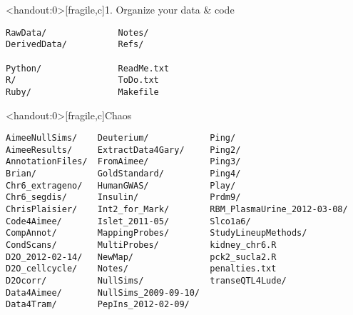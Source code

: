 \documentclass[12pt,t]{beamer}
\begin{document}
\begin{frame}<handout:0>[fragile,c]{1. Organize your data \& code}


\begin{center}
\begin{minipage}[c]{10.3cm}
\begin{semiverbatim}
\lstset{basicstyle=\normalsize}
\begin{lstlisting}[linewidth=10.3cm]
RawData/              Notes/
DerivedData/          Refs/

Python/               ReadMe.txt
R/                    ToDo.txt
Ruby/                 Makefile
\end{lstlisting}
\end{semiverbatim}
\end{minipage}
\end{center}

\end{frame}


\begin{frame}<handout:0>[fragile,c]{Chaos}

\addtocounter{framenumber}{-1}

\begin{center}
\begin{minipage}[c]{11.33cm}
\begin{semiverbatim}
\lstset{basicstyle=\scriptsize}
\begin{lstlisting}[linewidth=11.33cm]
AimeeNullSims/    Deuterium/            Ping/
AimeeResults/     ExtractData4Gary/     Ping2/
AnnotationFiles/  FromAimee/            Ping3/
Brian/            GoldStandard/         Ping4/
Chr6_extrageno/   HumanGWAS/            Play/
Chr6_segdis/      Insulin/              Prdm9/
ChrisPlaisier/    Int2_for_Mark/        RBM_PlasmaUrine_2012-03-08/
Code4Aimee/       Islet_2011-05/        Slco1a6/
CompAnnot/        MappingProbes/        StudyLineupMethods/
CondScans/        MultiProbes/          kidney_chr6.R
D2O_2012-02-14/   NewMap/               pck2_sucla2.R
D2O_cellcycle/    Notes/                penalties.txt
D2Ocorr/          NullSims/             transeQTL4Lude/
Data4Aimee/       NullSims_2009-09-10/
Data4Tram/        PepIns_2012-02-09/
\end{lstlisting}
\end{semiverbatim}
\end{minipage}
\end{center}

\end{frame}
\end{document}
